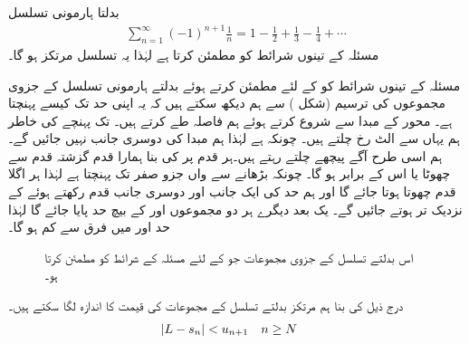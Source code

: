 بدلتا ہارمونی تسلسل
\begin{align*}
\sum_{n=1}^{\infty}(-1)^{n+1}\frac{1}{n}=1-\frac{1}{2}+\frac{1}{3}-\frac{1}{4}+\cdots
\end{align*}
مسئلہ  کے تینوں شرائط کو مطمئن کرتا ہے لہٰذا یہ تسلسل مرتکز ہو گا۔

مسئلہ  کے تینوں شرائط کو  کے لئے مطمئن کرتے ہوئے بدلتے ہارمونی تسلسل کے جزوی مجموعوں کی ترسیم (شکل ) سے ہم دیکھ سکتے ہیں کہ یہ اپنی حد  تک کیسے پہنچتا ہے۔ محور  کے مبدا سے شروع کرتے ہوئے ہم  فاصلہ طے کرتے ہیں۔  تک پہنچے کی خاطر ہم یہاں سے الٹ رخ  چلتے ہیں۔ چونکہ  ہے لہٰذا ہم مبدا کی دوسری جانب نہیں جائیں گے۔ ہم اسی طرح آگے پیچھے چلتے رہتے ہیں۔ہر  قدم پر  کی بنا ہمارا قدم گزشتہ قدم سے چھوٹا یا اس کے برابر ہو گا۔ چونکہ  بڑھانے سے  واں جزو صفر تک پہنچتا ہے لہٰذا ہر اگلا قدم  چھوتا ہوتا جائے گا اور ہم حد  کی ایک جانب اور دوسری جانب قدم رکھتے ہوئے  کے نزدیک تر ہوتے جائیں گے۔ یک بعد دیگرے ہر دو مجموعوں  اور  کے بیچ  حد  پایا جائے گا لہٰذا حد اور  میں فرق  سے کم ہو گا۔
\begin{figure}
\centering
{}
\caption{
اس بدلتے  تسلسل کے جزوی مجموعات جو  کے لئے مسئلہ  کے شرائط کو مطمئن کرتا ہو۔
}
\label{شکل_تسلسل_بدلتے_ہندسی_تسلسل_کے_جزوی_مجموعات}
\end{figure}

درج ذیل کی بنا ہم مرتکز بدلتے تسلسل کے مجموعات کی قیمت  کا اندازہ  لگا سکتے ہیں۔
\begin{align*}
\abs{L-s_n}&<u_{n+1}&&n\ge N
\end{align*}

